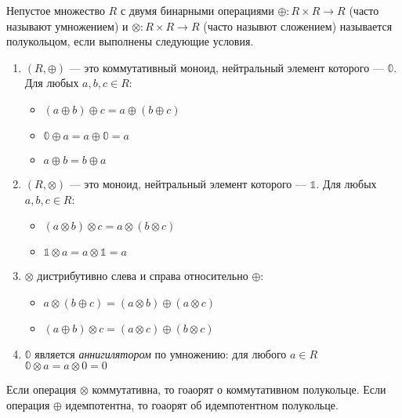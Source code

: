 \begin{definition}[Полукольцо]

Непустое множество $R$ с двумя бинарными операциями $\oplus\colon R \times R \to R$ (часто называют умножением) и $\otimes \colon R \times R \to R$ (часто назывют сложением) называется полукольцом, если выполнены следующие условия.
\begin{enumerate}

\item $(R, \oplus)$ --- это коммутативный моноид, нейтральный элемент которого --- $\mathbb{0}$. Для любых $a,b,c \in R$:
\begin{itemize}
	\item $(a \oplus b) \oplus c = a \oplus (b \oplus c)$
	\item $\mathbb{0} \oplus a = a \oplus \mathbb{0} = a$
	\item $a \oplus b = b \oplus a$
\end{itemize}

\item $(R, \otimes)$ --- это моноид, нейтральный элемент которого --- $\mathbb{1}$. Для любых $a,b,c \in R$:
\begin{itemize}
	\item $(a \otimes b) \otimes c = a \otimes (b \otimes c)$
    \item $\mathbb{1} \otimes a = a \otimes \mathbb{1} = a$
\end{itemize}

\item $\otimes$ дистрибутивно слева и справа относительно $\oplus$:
\begin{itemize}
	\item $a \otimes (b \oplus c) = (a \otimes b) \oplus (a \otimes c)$
    \item $(a \oplus b) \otimes c = (a \otimes c) \oplus (b \otimes c)$
\end{itemize}


\item $\mathbb{0}$ является \textit{аннигилятором} по умножению: для любого $a \in R$ 
$\mathbb{0} \otimes a = a \otimes 0 = 0$

\end{enumerate}

Если операция $\otimes$ коммутативна, то гоаорят о коммутативном полукольце.
Если операция $\oplus$ идемпотентна, то гоаорят об идемпотентном полукольце.

\end{definition}

